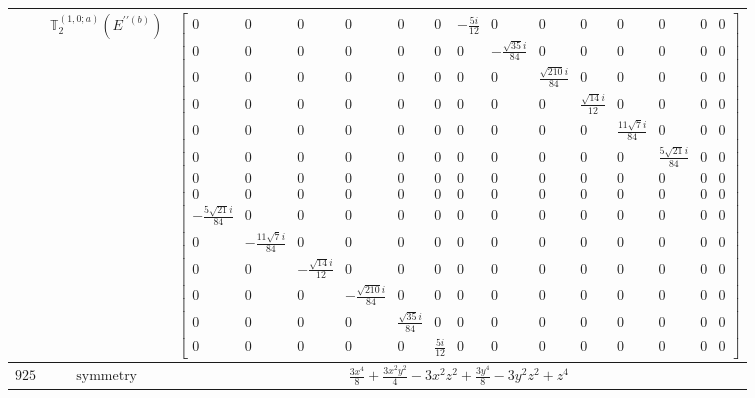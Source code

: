 \documentclass[fleqn,8pt,landscape]{jsarticle}
\begin{document}
\begin{longtable}{ccc}
$  $ & $ \mathbb{T}_{2}^{(1,0;a)}(E^{\prime\prime(b)}) $ & $ \begin{bmatrix} 0 & 0 & 0 & 0 & 0 & 0 & - \frac{5 i}{12} & 0 & 0 & 0 & 0 & 0 & 0 & 0 \\ 0 & 0 & 0 & 0 & 0 & 0 & 0 & - \frac{\sqrt{35} i}{84} & 0 & 0 & 0 & 0 & 0 & 0 \\ 0 & 0 & 0 & 0 & 0 & 0 & 0 & 0 & \frac{\sqrt{210} i}{84} & 0 & 0 & 0 & 0 & 0 \\ 0 & 0 & 0 & 0 & 0 & 0 & 0 & 0 & 0 & \frac{\sqrt{14} i}{12} & 0 & 0 & 0 & 0 \\ 0 & 0 & 0 & 0 & 0 & 0 & 0 & 0 & 0 & 0 & \frac{11 \sqrt{7} i}{84} & 0 & 0 & 0 \\ 0 & 0 & 0 & 0 & 0 & 0 & 0 & 0 & 0 & 0 & 0 & \frac{5 \sqrt{21} i}{84} & 0 & 0 \\ 0 & 0 & 0 & 0 & 0 & 0 & 0 & 0 & 0 & 0 & 0 & 0 & 0 & 0 \\ 0 & 0 & 0 & 0 & 0 & 0 & 0 & 0 & 0 & 0 & 0 & 0 & 0 & 0 \\ - \frac{5 \sqrt{21} i}{84} & 0 & 0 & 0 & 0 & 0 & 0 & 0 & 0 & 0 & 0 & 0 & 0 & 0 \\ 0 & - \frac{11 \sqrt{7} i}{84} & 0 & 0 & 0 & 0 & 0 & 0 & 0 & 0 & 0 & 0 & 0 & 0 \\ 0 & 0 & - \frac{\sqrt{14} i}{12} & 0 & 0 & 0 & 0 & 0 & 0 & 0 & 0 & 0 & 0 & 0 \\ 0 & 0 & 0 & - \frac{\sqrt{210} i}{84} & 0 & 0 & 0 & 0 & 0 & 0 & 0 & 0 & 0 & 0 \\ 0 & 0 & 0 & 0 & \frac{\sqrt{35} i}{84} & 0 & 0 & 0 & 0 & 0 & 0 & 0 & 0 & 0 \\ 0 & 0 & 0 & 0 & 0 & \frac{5 i}{12} & 0 & 0 & 0 & 0 & 0 & 0 & 0 & 0 \end{bmatrix} $ \\ \hline
$ 925 $ & $ \text{symmetry} $ & $ \frac{3 x^{4}}{8} + \frac{3 x^{2} y^{2}}{4} - 3 x^{2} z^{2} + \frac{3 y^{4}}{8} - 3 y^{2} z^{2} + z^{4} $ \\

\end{longtable}
\end{document}
